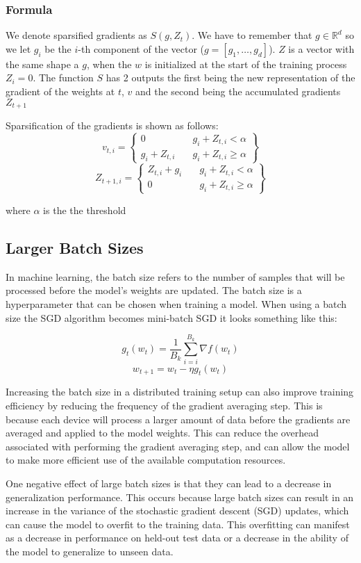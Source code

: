 \documentclass[11pt]{article}
\begin{document}
\subsubsection{Formula}
We denote sparsified gradients as $S(g, Z_t)$. We have to remember that $g \in \mathbb{R}^d$ so we let $g_i$ be the $i$-th component of the vector ($g=[g_1,\ldots,g_d]$). $Z$ is a vector with the same shape a $g$, when the $w$ is initialized at the start of the training process $Z_i = 0$. The function $S$ has 2 outputs the first being the new representation of the gradient of the weights at $t$, $v$ and the second being the accumulated gradients $Z_{t+1}$ 

Sparsification of the gradients is shown as follows: 
$$
v_{t,i} =
\left\{
	\begin{array}{cc}
		0 & \quad g_i + Z_{t,i}<\alpha \\
		g_i + Z_{t,i}	& \quad g_i + Z_{t,i} \geq \alpha
	\end{array}
\right\}
$$
$$
Z_{t+1,i} =
\left\{
	\begin{array}{cc}
		Z_{t,i} + g_i & \quad g_i + Z_{t,i}<\alpha \\
		0	& \quad g_i + Z_{t,i} \geq \alpha
	\end{array}
\right\}
$$

where $\alpha$ is the the threshold


\subsection{Larger Batch Sizes}
In machine learning, the batch size refers to the number of samples that will be processed before the model's weights are updated. The batch size is a hyperparameter that can be chosen when training a model. When using a batch size the SGD algorithm becomes mini-batch SGD it looks something like this:

$$
g_t(w_t) = \frac{1}{B_k} \sum_{i=i}^{B_k} {\nabla} f(w_t)
$$
$$
w_{t+1} = w_t - \eta g_t(w_t)
$$ 


Increasing the batch size in a distributed training setup can also improve training efficiency by reducing the frequency of the gradient averaging step. This is because each device will process a larger amount of data before the gradients are averaged and applied to the model weights. This can reduce the overhead associated with performing the gradient averaging step, and can allow the model to make more efficient use of the available computation resources.

One negative effect of large batch sizes is that they can lead to a decrease in generalization performance. This occurs because large batch sizes can result in an increase in the variance of the stochastic gradient descent (SGD) updates, which can cause the model to overfit to the training data. This overfitting can manifest as a decrease in performance on held-out test data or a decrease in the ability of the model to generalize to unseen data.
\end{document}
